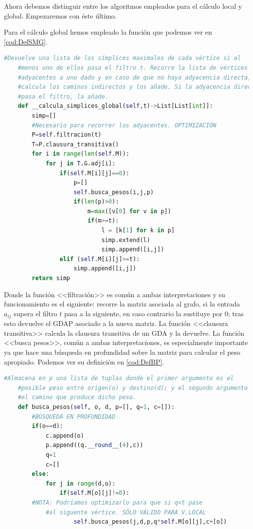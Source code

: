 \documentclass[12pt, a4paper, twoside]{book}
\numberwithin{equation}{section}
\theoremstyle{definition}
\theoremstyle{remark}
\theoremstyle{plain}
\begin{document}
	Ahora debemos distinguir entre los algoritmos empleados para el 
	cálculo local y global. Empezaremos con éste último.

	Para el cálculo global hemos empleado la función que podemos ver en 
	\autoref{cod:DefSMG}.

	\begin{lstlisting}[language=Python,float=htbp,caption=Función para el 
	cálculo de símplices maximales (global), label=cod:DefSMG]
	#Devuelve una lista de los símplices maximales de cada vértice si al 
	#menos uno de ellos pasa el filtro t. Recorre la lista de vértices 
	#adyacentes a uno dado y en caso de que no haya adyacencia directa, 
	#calcula los caminos indirectos y los añade. Si la adyacencia directa 
	#pasa el filtro, la añade.
	def __calcula_simplices_global(self,t)->List[List[int]]:
        simp=[]
        #Necesario para recorrer los adyacentes. OPTIMIZACIÓN
        P=self.filtracion(t)
        T=P.clausura_transitiva()
        for i in range(len(self.M)):
            for j in T.G.adj[i]:
                if(self.M[i][j]==0):
                    p=[]
                    self.busca_pesos(i,j,p)
                    if(len(p)>0):
                        m=max([v[0] for v in p])
                        if(m>=t):
                            l = [k[1] for k in p]
                            simp.extend(l)
                            simp.append([i,j])
                elif (self.M[i][j]>=t):
                    simp.append([i,j])
        return simp
	\end{lstlisting}

	Donde la función <<filtración>> es común a ambas 
	interpretaciones y su funcionamiento es el siguiente: recorre la 
	matriz asociada al grafo, si la entrada $a_{ij}$ supera el filtro $t$ 
	pasa a la siguiente, en caso contrario la sustituye por 0; tras esto 
	devuelve el GDAP asociado a la nueva matriz. La función 
	<<clausura transitiva>> calcula la clausura transitiva de un GDA y 
	la devuelve. La función <<busca pesos>>, común a ambas 
	interpretaciones, es especialmente importante ya 
	que hace una búsqueda en profundidad sobre la matriz para calcular el
	peso apropiado. Podemos ver su definición en \autoref{cod:DefBP}.

	\begin{lstlisting}[language=Python, float=htbp, caption= Función de 
	búsqueda de pesos, label=cod:DefBP]
	#Almacena en p una lista de tuplas donde el primer argumento es el 
	#posible peso entre origen(o) y destino(d); y el segundo argumento es 
	#el camino que produce dicho peso. 
	def busca_pesos(self, o, d, p=[], q=1, c=[]):
        #BÚSQUEDA EN PROFUNDIDAD
        if(o==d):
            c.append(o)
            p.append((q.__round__(4),c))
            q=1
            c=[]
        else:   
            for j in range(d,o):
                if(self.M[o][j]!=0):
        #NOTA: Podríamos optimizarlo para que si q<t pase 
		    #al siguente vértice. SÓLO VÁLIDO PARA V.LOCAL
                    self.busca_pesos(j,d,p,q*self.M[o][j],c+[o])
	\end{lstlisting}
\end{document}
